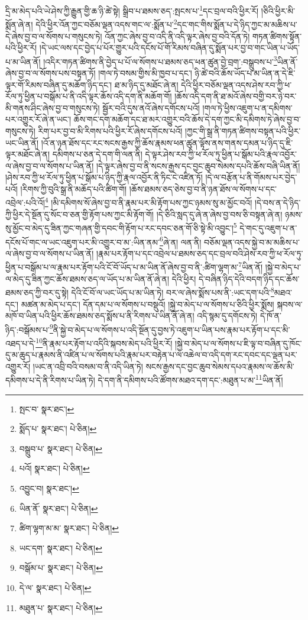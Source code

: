 དྲི་མ་མེད་པའི་ཡེ་ཤེས་ཀྱི་རྒྱུན་གྱི་ཆ་ཉི་ཚེ་སྟེ། སྒྲིབ་པ་ཐམས་ཅད་:སྤངས་པ་\footnote{སྤང་བ་  སྣར་ཐང་། }དང་བྲལ་བའི་ཕྱིར་རོ། །ཅིའི་ཕྱིར་མི་སྨོན་ཞེ་ན། དེའི་ཕྱིར་འོན་ཀྱང་བཅོམ་ལྡན་འདས་གང་ལ་:སྨོན་པ་\footnote{སྨོད་པ་  སྣར་ཐང་།  པེ་ཅིན། }དང་གང་གིས་སྨོན་པ་དེ་ཉིད་ཀྱང་མ་མཆིས་པ་དེ་ཞེས་བྱ་བ་ལ་སོགས་པ་གསུངས་ཏེ། འོན་ཀྱང་ཞེས་བྱ་བ་འདི་ནི་འདི་ལྟར་ཞེས་བྱ་བའི་དོན་ཏེ། གཏན་ཚིགས་སྟོན་པའི་ཕྱིར་རོ། །དེ་ཡང་ལས་དང་བྱེད་པ་པོར་གྱུར་པའི་དངོས་པོ་གོ་རིམས་བཞིན་དུ་སྨོན་པར་བྱ་བ་གང་ཡིན་པ་ཡོད་པ་མ་ཡིན་ནོ། །འདིར་གཏན་ཚིགས་ནི་བྱེད་པ་པོ་ལ་སོགས་པ་ཐམས་ཅད་ཕན་ཚུན་བྱེ་བྲག་:བསྒྲུབས་པ་\footnote{བསྒྲུབ་པ་  སྣར་ཐང་།  པེ་ཅིན། }ཡིན་ནོ་ཞེས་བྱ་བ་ལ་སོགས་པས་བསྟན་ཏོ། །གལ་ཏེ་བསམ་གྱིས་མི་ཁྱབ་པ་དང་། ཉི་ཚེ་བའི་ཆོས་ཡོད་པ་མ་ཡིན་ན་དེ་ཇི་ལྟར་གོ་རིམས་བཞིན་དུ་མཆོག་ཉིད་དང་། ཐ་མ་ཉིད་དུ་མཐོང་ཞེ་ན། དེའི་ཕྱིར་བཅོམ་ལྡན་འདས་ཤེས་རབ་ཀྱི་ཕ་རོལ་ཏུ་ཕྱིན་པ་བསྒོམ་པ་ནི་འདི་ལྟར་ཆོས་འདི་དག་ནི་མཆོག་གོ། །ཆོས་འདི་དག་ནི་ཐ་མའོ་ཞེས་བགྱི་བར་ཉེ་བར་མི་གནས་ཤིང་ཞེས་བྱ་བ་གསུངས་ཏེ། སྦྱོར་བའི་དུས་ནའོ་ཞེས་དགོངས་པའོ། །གལ་ཏེ་ཕྱིས་འཇུག་པ་ན་དམིགས་པར་འགྱུར་རོ་ཞེ་ན་ཡང་། ཆོས་གང་དག་མཆོག་དང་ཐ་མར་འགྱུར་བའི་ཆོས་དེ་དག་ཀྱང་མི་དམིགས་ཏེ་ཞེས་བྱ་བ་གསུངས་ཏེ། རིག་པར་བྱ་བ་མི་རིགས་པའི་ཕྱིར་རོ་ཞེས་དགོངས་པའོ། །ཀྱང་གི་སྒྲ་ནི་གཏན་ཚིགས་བསྟན་པའི་ཕྱིར་ཡང་ཡིན་ནོ། །འོ་ན་ཉན་ཐོས་དང་རང་སངས་རྒྱས་ཀྱི་ཆོས་རྣམས་ཕན་ཚུན་ལྟོས་ནས་གནས་དམན་པ་ཉིད་དུ་ཇི་ལྟར་མཐོང་ཞེ་ན། དམིགས་པ་ཅན་དེ་དག་གི་ལན་ནི། དེ་ལྟར་ཤེས་རབ་ཀྱི་ཕ་རོལ་ཏུ་ཕྱིན་པ་སྒོམ་པའི་རྣལ་འབྱོར་ལ་ཞེས་བྱ་བ་ལ་སོགས་པ་ཡིན་ནོ། །དེ་ལྟར་ཞེས་བྱ་བ་ནི་སངས་རྒྱས་དང་བྱང་ཆུབ་སེམས་དཔའི་ཆོས་བཞི་ཡིན་ནོ། །ཤེས་རབ་ཀྱི་ཕ་རོལ་ཏུ་ཕྱིན་པ་སྒོམ་པ་ཉིད་ཀྱི་རྣལ་འབྱོར་ནི་ཏིང་ངེ་འཛིན་ཏོ། །དེ་ལ་བརྩོན་པ་ནི་གོམས་པར་བྱེད་པའོ། །རིགས་ཀྱི་བུའི་སྒྲ་ནི་མཆོད་པའི་ཚིག་གོ། །ཆོས་ཐམས་ཅད་ཅེས་བྱ་བ་ནི་ཉན་ཐོས་ལ་སོགས་པ་དང་འབྲེལ་:པའི་འོ།\footnote{པའོ།  སྣར་ཐང་།  པེ་ཅིན། } །མི་དམིགས་སོ་ཞེས་བྱ་བ་ནི་རྣམ་པར་མི་རྟོག་པས་ཀྱང་ཉམས་སུ་མ་མྱོང་བའོ། །དེ་བས་ན་དེ་ཉིད་ཀྱི་ཕྱིར་དེ་སྔོན་དུ་སོང་བ་ཅན་གྱི་རྟོག་པས་ཀྱང་མི་རྟོག་གོ། །དེ་ཅིའི་སླད་དུ་ཞེ་ན་ཞེས་བྱ་བས་ཅི་བསྟན་ཞེ་ན། ཉམས་སུ་མྱོང་བ་མེད་དུ་ཟིན་ཀྱང་གཞན་གྱི་དབང་གི་རྟོག་པ་རང་དབང་ཅན་གོ་ཅི་སྟེ་མི་འབྱུང་།\footnote{འབྱུང་བ།  སྣར་ཐང་། } དེ་གང་དུ་འཇུག་པ་ན་དངོས་པོ་གང་ལ་ཡང་འཇུག་པར་མི་འགྱུར་བ་མ་:ཡིན་ནམ་\footnote{ཡིན་ནོ་  སྣར་ཐང་།  པེ་ཅིན། }ཞེ་ན། ལན་ནི། བཅོམ་ལྡན་འདས་སྐྱེ་བ་མ་མཆིས་པ་ལ་ཞེས་བྱ་བ་ལ་སོགས་པ་ཡིན་ནོ། །རྣམ་པར་རྟོག་པ་དང་འབྲེལ་པ་ཐམས་ཅད་དང་བྲལ་བའི་ཤེས་རབ་ཀྱི་ཕ་རོལ་ཏུ་ཕྱིན་པ་བསྒོམ་པ་ལ་རྣམ་པར་རྟོག་པའི་ངོ་བོ་ཡོད་པ་མ་ཡིན་ནོ་ཞེས་བྱ་བ་ནི་:ཚིག་ལྷག་མ་\footnote{ཚིག་ལྷག་མ་མ་  སྣར་ཐང་།  པེ་ཅིན། }ཡིན་ནོ། །སྐྱེ་བ་མེད་པ་ལ་མེད་དུ་ཟིན་ཀྱང་ཆོས་ཐམས་ཅད་ལ་ཡོད་པ་མ་ཡིན་ནོ་ཞེ་ན། དེའི་ཕྱིར། དེ་བཞིན་ཉིད་དེའི་བདག་ཉིད་དང་ཆོས་ཐམས་ཅད་ཀྱི་བར་དུ་སྟེ། དེའི་ངོ་བོ་ལ་ཡང་ཡོད་པ་མ་ཡིན་ཏེ། བར་ལ་ཞེས་སྨོས་པས་ནི་:ཡང་དག་པའི་\footnote{ཡང་དག་  སྣར་ཐང་།  པེ་ཅིན། }མཐའ་དང་། མཚན་མ་མེད་པ་དང་། དོན་དམ་པ་ལ་སོགས་པ་བསྡུའོ། །སྐྱེ་བ་མེད་པ་ལ་སོགས་པ་ཅིའི་ཕྱིར་སྨོས། སྐབས་ལ་མཁོ་བ་ཡིན་པའི་ཕྱིར་ཆོས་ཐམས་ཅད་སྨོས་པ་ནི་རིགས་པ་ཡིན་ནོ་ཞེ་ན། འདི་སྙམ་དུ་དགོངས་ཏེ། དེ་ཁོ་ན་ཉིད་:བསྒོམས་པ་\footnote{བསྒོམ་པ་  སྣར་ཐང་།  པེ་ཅིན། }ནི་སྐྱེ་བ་མེད་པ་ལ་སོགས་པ་འདི་སྔོན་དུ་བྱས་ཏེ་འཇུག་པ་ཡིན་པས་རྣམ་པར་རྟོག་པ་དང་མི་འཐད་པ་དེ་\footnote{དེ་ལ་  སྣར་ཐང་།  པེ་ཅིན། }ནི་རྣམ་པར་རྟོག་པ་འདིའི་སྐབས་མེད་པའི་ཕྱིར་རོ། །སྐྱེ་བ་མེད་པ་ལ་སོགས་པ་ཇི་ལྟ་བ་བཞིན་དུ་ཁོང་དུ་མ་ཆུད་པ་རྣམས་ནི་འཛིན་པ་ལ་སོགས་པའི་རྣམ་པར་བརྟེན་པ་ལ་འཆེལ་བ་འདི་དག་རང་དབང་དང་ལྡན་པར་འགྱུར་རོ། །ཡང་ན་འབྲི་བའི་བསམ་བ་ནི་འདི་ཡིན་ཏེ། སངས་རྒྱས་དང་བྱང་ཆུབ་སེམས་དཔའ་རྣམས་ལ་ཆོས་མི་དམིགས་པ་དེ་ནི་རིགས་པ་ཡིན་ཏེ། དེ་དག་ནི་དམིགས་པའི་ཚོགས་མཐའ་དག་དང་:མཐུན་པ་མ་\footnote{མཐུན་པ་  སྣར་ཐང་།  པེ་ཅིན། }ཡིན་ནོ། 